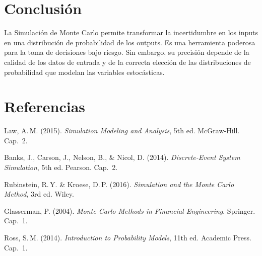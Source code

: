 \documentclass[11pt, letterpaper]{article}
\begin{document}
\section{Conclusión}
La Simulación de Monte Carlo permite transformar la incertidumbre en los inputs en una distribución de probabilidad de los outputs. Es una herramienta poderosa para la toma de decisiones bajo riesgo. Sin embargo, su precisión depende de la calidad de los datos de entrada y de la correcta elección de las distribuciones de probabilidad que modelan las variables estocásticas.

\section*{Referencias}
\begin{enumerate}[label={[\arabic*]}]
    \item Law, A.\,M. (2015). \textit{Simulation Modeling and Analysis}, 5th ed. McGraw-Hill. Cap.~2.
    \item Banks, J., Carson, J., Nelson, B., \& Nicol, D. (2014). \textit{Discrete-Event System Simulation}, 5th ed. Pearson. Cap.~2.
    \item Rubinstein, R.\,Y. \& Kroese, D.\,P. (2016). \textit{Simulation and the Monte Carlo Method}, 3rd ed. Wiley.
    \item Glasserman, P. (2004). \textit{Monte Carlo Methods in Financial Engineering}. Springer. Cap.~1.
    \item Ross, S.\,M. (2014). \textit{Introduction to Probability Models}, 11th ed. Academic Press. Cap.~1.
\end{enumerate}
\end{document}
